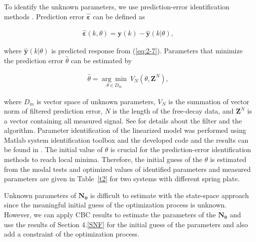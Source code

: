 \documentclass[openacc]{rsproca_new}%
\def\epsilon{\varepsilon}
\def\vec#1{\ensuremath{\mathbf{#1}}}
\newcommand{\Eref}[1]{(\ref{#1})}
\newcommand{\Tref}[1]{Table~\ref{#1}}
\begin{document}
\noindent To identify the unknown parameters, we use prediction-error identification methods \cite{ljung2001system}. Prediction error \vec{\hat \epsilon} can be defined as

\begin{align}\label{eq:2-9}
\vec{\hat \epsilon}(k,\theta)=\vec{y}(k)-\hat{\vec{y}}(k|\theta),
\end{align}

\noindent where $\hat{\vec{y}}(k|\theta)$ is predicted response from \Eref{eq:2-7}. Parameters that minimize the prediction error $\hat \theta$ can be estimated by

\begin{align}\label{eq:2-10}
\hat{\theta}=\underset{\theta \in D_m}{\arg\min} \: V_N(\theta,\vec{Z}^N),
\end{align}

\noindent where $D_m$ is vector space of unknown parameters, $V_N$ is the summation of vector norm of filtered prediction error, $N$ is the length of the free-decay data, and $\vec{Z}^N$ is a vector containing all measured signal. See \cite{ljung2001system} for details about the filter and the algorithm. Parameter identification of the linearized model was performed using Matlab system identification toolbox \cite{ljung1988system} and the developed code and the results can be found in \cite{sysID}. The initial value of $\theta$ is crucial for the prediction-error identification methods to reach local minima. Therefore, the initial guess of the $\theta$ is estimated from the modal tests and optimized values of identified parameters and measured parameters are given in \Tref{t2} for two systems with different spring plate.

Unknown parameters of $\vec{N_0}$ is difficult to estimate with the state-space approach since the meaningful initial guess of the optimization process is unknown. However, we can apply CBC results to estimate the parameters of the $\vec{N_0}$ and use the results of
Section 4.\ref{SNF} for the initial guess of the parameters and also add a constraint of the optimization process.
\end{document}
